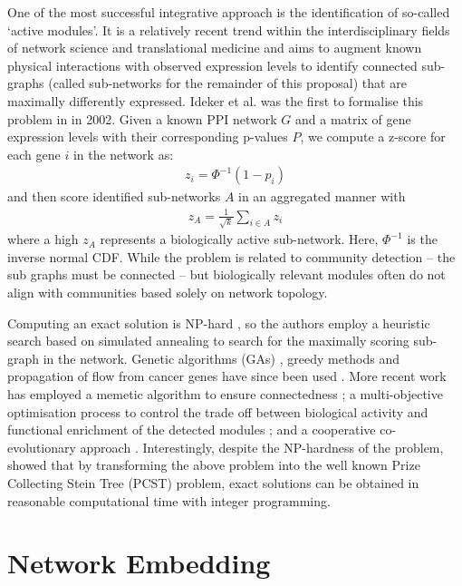 \documentclass{report}
\begin{document}
	One of the most successful integrative approach is the identification of so-called `active modules'. It is a relatively recent trend within the interdisciplinary fields of network science and translational medicine and aims to augment known physical interactions with observed expression levels to identify connected sub-graphs (called sub-networks for the remainder of this proposal) that are maximally differently expressed. Ideker et al. was the first to formalise this problem in \cite{ideker2002discovering} in 2002. Given a known PPI network $G$ and a matrix of gene expression levels with their corresponding p-values $P$, we compute a z-score for each gene $i$ in the network as:
	\begin{align}
	z_i = \Phi^{-1}(1 - p_i)
	\end{align}
	and then score identified sub-networks $A$ in an aggregated manner with 
	\begin{align}
	z_A = \frac{1}{\sqrt{k}}\sum_{i\in A}z_i
	\label{ideker}
	\end{align}
	where a high $z_A$ represents a biologically active sub-network. Here, $\Phi^{-1}$ is the inverse normal CDF. While the problem is related to community detection -- the sub graphs must be connected -- but biologically relevant modules often do not align with communities based solely on network topology.
	
	Computing an exact solution is NP-hard \cite{ideker2002discovering}, so the authors employ a heuristic search based on simulated annealing to search for the maximally scoring sub-graph in the network. Genetic algorithms (GAs) \cite{Klammer2010}, greedy methods \cite{nacu2007gene} and propagation of flow from cancer genes have since been used \cite{vandin2011algorithms}. More recent work has employed a memetic algorithm to ensure connectedness \cite{li2017active}; a multi-objective optimisation process to control the trade off between biological activity and functional enrichment of the detected modules \cite{chen2017prior}; and a cooperative co-evolutionary approach \cite{he2016cooperative}. Interestingly, despite the NP-hardness of the problem, \cite{dittrich2008identifying} showed that by transforming the above problem into the well known Prize Collecting Stein Tree (PCST) problem, exact solutions can be obtained in reasonable computational time with integer programming.
	
	
	\section{Network Embedding}
	
\end{document}
